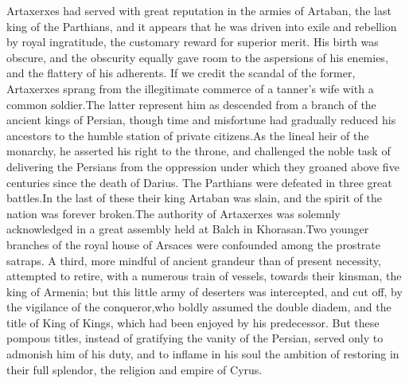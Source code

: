 
Artaxerxes had served with great reputation in the armies of
Artaban, the last king of the Parthians, and it appears that he
was driven into exile and rebellion by royal ingratitude, the
customary reward for superior merit. His birth was obscure, and
the obscurity equally gave room to the aspersions of his enemies,
and the flattery of his adherents. If we credit the scandal of
the former, Artaxerxes sprang from the illegitimate commerce of a
tanner’s wife with a common soldier.\footnotemark[3] The latter represent him
as descended from a branch of the ancient kings of Persian,
though time and misfortune had gradually reduced his ancestors to
the humble station of private citizens.\footnotemark[4] As the lineal heir of
the monarchy, he asserted his right to the throne, and challenged
the noble task of delivering the Persians from the oppression
under which they groaned above five centuries since the death of
Darius. The Parthians were defeated in three great battles.\footnotemark[401]
In the last of these their king Artaban was slain, and the spirit
of the nation was forever broken.\footnotemark[5] The authority of Artaxerxes
was solemnly acknowledged in a great assembly held at Balch in
Khorasan.\footnotemark[501] Two younger branches of the royal house of Arsaces
were confounded among the prostrate satraps. A third, more
mindful of ancient grandeur than of present necessity, attempted
to retire, with a numerous train of vessels, towards their
kinsman, the king of Armenia; but this little army of deserters
was intercepted, and cut off, by the vigilance of the conqueror,\footnotemark[6]
who boldly assumed the double diadem, and the title of King of
Kings, which had been enjoyed by his predecessor. But these
pompous titles, instead of gratifying the vanity of the Persian,
served only to admonish him of his duty, and to inflame in his
soul the ambition of restoring in their full splendor, the
religion and empire of Cyrus.

